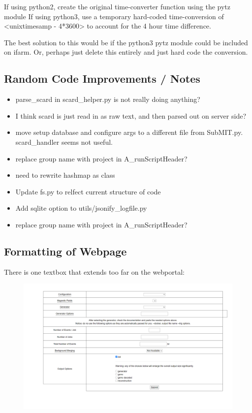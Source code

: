         If using python2, create the original time-converter function using the pytz module
        If using python3, use a temporary hard-coded time-conversion of <unixtimesamp - 4*3600> to account for the 4 hour time difference.
        
        The best solution to this would be if the python3 pytz module could be included on ifarm. Or, perhaps just delete this entirely and just hard code the conversion.
    
    \subsection{Random Code Improvements / Notes}
        \begin{itemize}
            \item parse\_scard in scard\_helper.py is not really doing anything?
            \item I think scard is just read in as raw text, and then parsed out on server side?
            \item move setup database and configure args to a different file from SubMIT.py. scard\_handler seems not useful.
            \item replace group name with project in A\_runScriptHeader?
            \item need to rewrite hashmap as class
            \item Update fs.py to relfect current structure of code
            \item Add sqlite option to utils/jsonify\_logfile.py
            \item replace group name with project in A\_runScriptHeader?
        \end{itemize}
    \subsection{Formatting of Webpage}
        There is one textbox that extends too far on the webportal:
        \begin{figure}[ht]
        \includegraphics[width=16cm]{xxTasks/pics/pullthisin.png}
        \end{figure}


